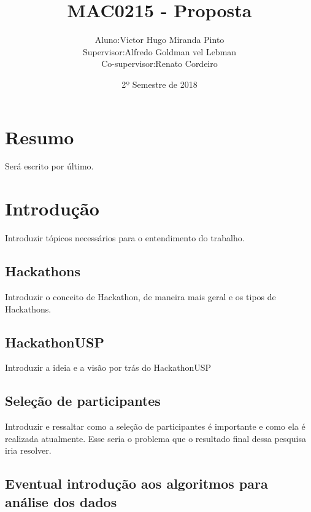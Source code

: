 \documentclass[10pt,twoside,a4paper]{article}
\title{MAC0215 - Proposta}
\author{
  \begin{tabular}{rl}
    Aluno:      & Victor Hugo Miranda Pinto \\
    Supervisor: & Alfredo Goldman vel Lebman \\
    Co-supervisor: & Renato Cordeiro
  \end{tabular}
}
\date{2º Semestre de 2018}
\begin{document}
\maketitle

\section{Resumo}
  Será escrito por último.

\section{Introdução}

  Introduzir tópicos necessários para o entendimento do trabalho.

  \subsection{Hackathons}
  
    Introduzir o conceito de Hackathon, de maneira mais geral e os tipos de Hackathons.

    
  \subsection{HackathonUSP}

    Introduzir a ideia e a visão por trás do HackathonUSP
    
  \subsection{Seleção de participantes}
    
    Introduzir e ressaltar como a seleção de participantes é importante e como ela é realizada atualmente. Esse seria o problema que o resultado final dessa pesquisa iria resolver.

  \subsection{Eventual introdução aos algoritmos para análise dos dados}
    
\end{document}
